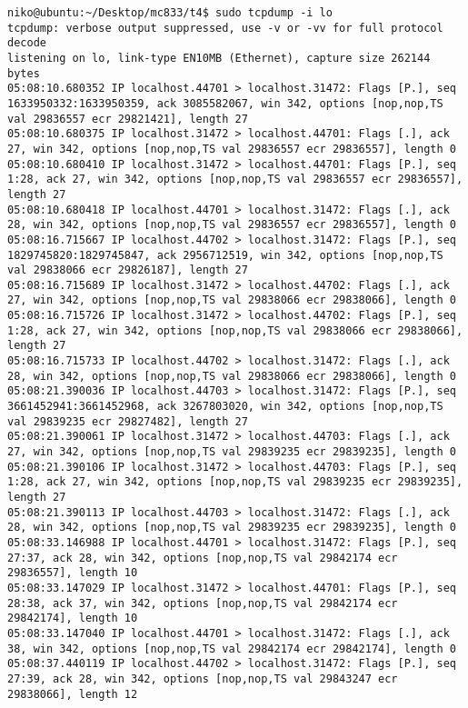 \documentclass[a4paper,10pt]{article}
\begin{document}
\begin{lstlisting}
niko@ubuntu:~/Desktop/mc833/t4$ sudo tcpdump -i lo
tcpdump: verbose output suppressed, use -v or -vv for full protocol decode
listening on lo, link-type EN10MB (Ethernet), capture size 262144 bytes
05:08:10.680352 IP localhost.44701 > localhost.31472: Flags [P.], seq 1633950332:1633950359, ack 3085582067, win 342, options [nop,nop,TS val 29836557 ecr 29821421], length 27
05:08:10.680375 IP localhost.31472 > localhost.44701: Flags [.], ack 27, win 342, options [nop,nop,TS val 29836557 ecr 29836557], length 0
05:08:10.680410 IP localhost.31472 > localhost.44701: Flags [P.], seq 1:28, ack 27, win 342, options [nop,nop,TS val 29836557 ecr 29836557], length 27
05:08:10.680418 IP localhost.44701 > localhost.31472: Flags [.], ack 28, win 342, options [nop,nop,TS val 29836557 ecr 29836557], length 0
05:08:16.715667 IP localhost.44702 > localhost.31472: Flags [P.], seq 1829745820:1829745847, ack 2956712519, win 342, options [nop,nop,TS val 29838066 ecr 29826187], length 27
05:08:16.715689 IP localhost.31472 > localhost.44702: Flags [.], ack 27, win 342, options [nop,nop,TS val 29838066 ecr 29838066], length 0
05:08:16.715726 IP localhost.31472 > localhost.44702: Flags [P.], seq 1:28, ack 27, win 342, options [nop,nop,TS val 29838066 ecr 29838066], length 27
05:08:16.715733 IP localhost.44702 > localhost.31472: Flags [.], ack 28, win 342, options [nop,nop,TS val 29838066 ecr 29838066], length 0
05:08:21.390036 IP localhost.44703 > localhost.31472: Flags [P.], seq 3661452941:3661452968, ack 3267803020, win 342, options [nop,nop,TS val 29839235 ecr 29827482], length 27
05:08:21.390061 IP localhost.31472 > localhost.44703: Flags [.], ack 27, win 342, options [nop,nop,TS val 29839235 ecr 29839235], length 0
05:08:21.390106 IP localhost.31472 > localhost.44703: Flags [P.], seq 1:28, ack 27, win 342, options [nop,nop,TS val 29839235 ecr 29839235], length 27
05:08:21.390113 IP localhost.44703 > localhost.31472: Flags [.], ack 28, win 342, options [nop,nop,TS val 29839235 ecr 29839235], length 0
05:08:33.146988 IP localhost.44701 > localhost.31472: Flags [P.], seq 27:37, ack 28, win 342, options [nop,nop,TS val 29842174 ecr 29836557], length 10
05:08:33.147029 IP localhost.31472 > localhost.44701: Flags [P.], seq 28:38, ack 37, win 342, options [nop,nop,TS val 29842174 ecr 29842174], length 10
05:08:33.147040 IP localhost.44701 > localhost.31472: Flags [.], ack 38, win 342, options [nop,nop,TS val 29842174 ecr 29842174], length 0
05:08:37.440119 IP localhost.44702 > localhost.31472: Flags [P.], seq 27:39, ack 28, win 342, options [nop,nop,TS val 29843247 ecr 29838066], length 12

\end{lstlisting}
\end{document}
